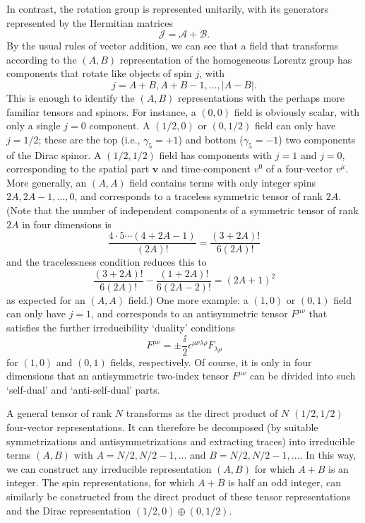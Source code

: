 In contrast, the rotation group is represented unitarily, with its generators
represented by the Hermitian matrices
\begin{equation}
\mathcal{J}=\mathcal{A}+\mathcal{B}.
\tag{5.6.18}\label{eq:5.6.18}
\end{equation}
By the usual rules of vector addition, we can see that a field that transforms
according to the $(A,B)$ representation of the homogeneous Lorentz group has
components that rotate like objects of spin $j$, with
\[
j=A+B,A+B-1,\ldots,|A-B|.
\]
This is enough to identify the $(A,B)$ representations with the perhaps more
familiar tensors and spinors. For instance, a $(0,0)$ field is obviously
scalar, with only a single $j=0$ component. A $(1/2,0)$ or $(0,1/2)$ field can
only have $j=1/2$; these are the top (i.e., $\gamma_5=+1$) and bottom
($\gamma_5=-1$) two components of the Dirac spinor. A $(1/2,1/2)$ field has
components with $j=1$ and $j=0$, corresponding to the spatial part
$\mathbf v$ and time-component $v^0$ of a four-vector $v^\mu$. More generally,
an $(A,A)$ field contains terms with only integer spins
$2A,2A-1,\ldots,0$, and corresponds to a traceless symmetric tensor of rank
$2A$. (Note that the number of independent components of a symmetric tensor
of rank $2A$ in four dimensions is
\[
\frac{4\cdot5\cdots(4+2A-1)}{(2A)!}=\frac{(3+2A)!}{6(2A)!}
\]
and the tracelessness condition reduces this to
\[
\frac{(3+2A)!}{6(2A)!}-\frac{(1+2A)!}{6(2A-2)!}=(2A+1)^2
\]
as expected for an $(A,A)$ field.) One more example: a $(1,0)$ or $(0,1)$
field can only have $j=1$, and corresponds to an antisymmetric tensor
$F^{\mu\nu}$ that satisfies the further irreducibility `duality' conditions
\[
F^{\mu\nu}=\mathbin{\pm}\frac{\ii}{2}\epsilon^{\mu\nu\lambda\rho}F_{\lambda\rho}
\]
for $(1,0)$ and $(0,1)$ fields, respectively. Of course, it is only in four
dimensions that an antisymmetric two-index tensor $F^{\mu\nu}$ can be divided
into such `self-dual' and `anti-self-dual' parts.

A general tensor of rank $N$ transforms as the direct product of $N$
$(1/2,1/2)$ four-vector representations. It can therefore be decomposed (by
suitable symmetrizations and antisymmetrizations and extracting traces) into
irreducible terms $(A,B)$ with $A=N/2,N/2-1,\ldots$ and
$B=N/2,N/2-1,\ldots$. In this way, we can construct any irreducible
representation $(A,B)$ for which $A+B$ is an integer. The spin
representations, for which $A+B$ is half an odd integer, can similarly be
constructed from the direct product of these tensor representations and the
Dirac representation $(1/2,0)\oplus(0,1/2)$.

